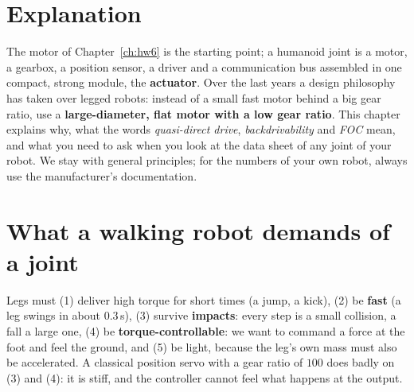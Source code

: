 \label{ch:hw7}

\section*{Explanation}
The motor of Chapter~\ref{ch:hw6} is the starting point; a humanoid joint is a motor, a gearbox, a position sensor, a driver and a communication bus assembled in one compact, strong module, the \textbf{actuator}. Over the last years a design philosophy has taken over legged robots: instead of a small fast motor behind a big gear ratio, use a \textbf{large-diameter, flat motor with a low gear ratio}. This chapter explains why, what the words \emph{quasi-direct drive}, \emph{backdrivability} and \emph{FOC} mean, and what you need to ask when you look at the data sheet of any joint of your robot. We stay with general principles; for the numbers of your own robot, always use the manufacturer's documentation.

\section*{What a walking robot demands of a joint}
Legs must (1) deliver high torque for short times (a jump, a kick), (2) be \textbf{fast} (a leg swings in about $0.3$\,s), (3) survive \textbf{impacts}: every step is a small collision, a fall a large one, (4) be \textbf{torque-controllable}: we want to command a force at the foot and feel the ground, and (5) be light, because the leg's own mass must also be accelerated. A classical position servo with a gear ratio of $100$ does badly on (3) and (4): it is stiff, and the controller cannot feel what happens at the output.

